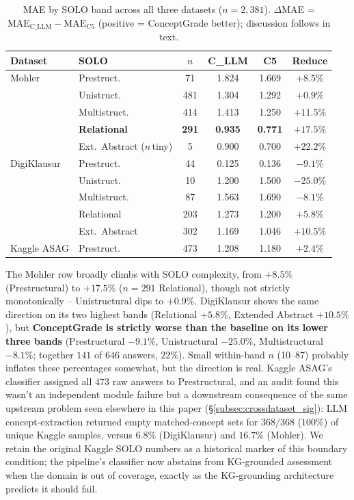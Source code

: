 \documentclass[conference]{IEEEtran}
\begin{document}
\begin{table}[t]
\caption{MAE by SOLO band across all three datasets ($n=2{,}381$).
         $\Delta$MAE =
         $\text{MAE}_{\text{C\_LLM}} - \text{MAE}_{\text{C5}}$ (positive
         = ConceptGrade better); discussion follows in text.}
\label{tab:solo_analysis}
\centering
\footnotesize
\setlength{\tabcolsep}{4pt}
\begin{tabular}{llcccc}
\toprule
\textbf{Dataset} & \textbf{SOLO} & \textbf{$n$} &
\textbf{C\_LLM} & \textbf{C5} & \textbf{Reduce} \\
\midrule
Mohler     & Prestruct.    &  71 & 1.824 & 1.669 & $+8.5\%$ \\
           & Unistruct.    & 481 & 1.304 & 1.292 & $+0.9\%$ \\
           & Multistruct.  & 414 & 1.413 & 1.250 & $+11.5\%$ \\
           & \textbf{Relational} & \textbf{291} & \textbf{0.935} & \textbf{0.771} & \textbf{$+17.5\%$} \\
           & Ext.\ Abstract ($n$\,tiny) & 5 & 0.900 & 0.700 & $+22.2\%$ \\
\midrule
DigiKlausur & Prestruct.   &  44 & 0.125 & 0.136 & $-9.1\%$ \\
           & Unistruct.    &  10 & 1.200 & 1.500 & $-25.0\%$ \\
           & Multistruct.  &  87 & 1.563 & 1.690 & $-8.1\%$ \\
           & Relational    & 203 & 1.273 & 1.200 & $+5.8\%$ \\
           & Ext.\ Abstract & 302 & 1.169 & 1.046 & $+10.5\%$ \\
\midrule
Kaggle ASAG & Prestruct.   & 473 & 1.208 & 1.180 & $+2.4\%$ \\
\bottomrule
\end{tabular}
\end{table}

The Mohler row broadly climbs with SOLO complexity, from $+8.5\%$
(Prestructural) to $+17.5\%$ ($n=291$ Relational), though not strictly
monotonically -- Unistructural dips to $+0.9\%$. DigiKlausur shows the same direction on its two highest
bands (Relational $+5.8\%$, Extended Abstract $+10.5\%$), but
\textbf{ConceptGrade is strictly worse than the baseline on its lower
three bands} (Prestructural $-9.1\%$, Unistructural $-25.0\%$,
Multistructural $-8.1\%$; together $141$ of $646$ answers, $22\%$).
Small within-band $n$ (10--87) probably inflates these percentages
somewhat, but the direction is real. Kaggle ASAG's classifier assigned
all $473$ raw answers to Prestructural, and an audit found this
wasn't an independent module failure but a downstream consequence of
the same upstream problem seen elsewhere in this paper
(\S\ref{subsec:crossdataset_sig}): LLM concept-extraction returned
empty matched-concept sets for $368/368$ ($100\%$) of unique Kaggle
samples, versus $6.8\%$
(DigiKlausur) and $16.7\%$ (Mohler). We retain the original Kaggle SOLO
numbers as a historical marker of this boundary condition; the
pipeline's classifier now abstains from KG-grounded assessment when
the domain is out of coverage, exactly as the KG-grounding
architecture predicts it should fail.
\end{document}
